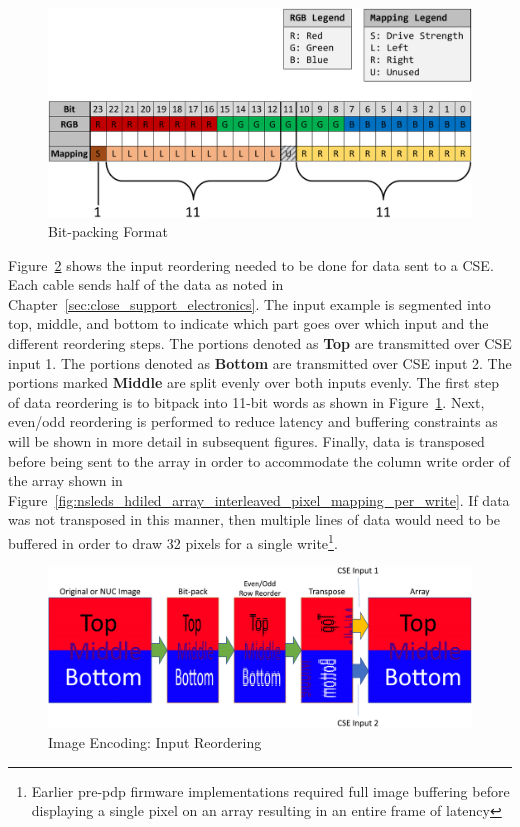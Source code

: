     \begin{figure}
        \centering
        \includegraphics[trim=0in 0in 0in 0in,width=1.0\textwidth]{fig/bit_packing.pdf}
        \caption{Bit-packing Format}
        \label{fig:bit_packing}
    \end{figure}

    Figure~\ref{fig:image_encoding} shows the input reordering needed to be done for data sent to a CSE. Each cable sends half of the data as noted in Chapter~\ref{sec:close_support_electronics}. The input example is segmented into top, middle, and bottom to indicate which part goes over which input and the different reordering steps. The portions denoted as \textbf{Top} are transmitted over CSE input 1. The portions denoted as \textbf{Bottom} are transmitted over CSE input 2. The portions marked \textbf{Middle} are split evenly over both inputs evenly. The first step of data reordering is to bitpack into 11-bit words as shown in Figure~\ref{fig:bit_packing}. Next, even/odd reordering is performed to reduce latency and buffering constraints as will be shown in more detail in subsequent figures. Finally, data is transposed before being sent to the array in order to accommodate the column write order of the array shown in Figure~\ref{fig:nsleds_hdiled_array_interleaved_pixel_mapping_per_write}. If data was not transposed in this manner, then multiple lines of data would need to be buffered in order to draw 32 pixels for a single write\footnote{Earlier pre-pdp firmware implementations required full image buffering before displaying a single pixel on an array resulting in an entire frame of latency}.


    \begin{figure}
        \centering
        \includegraphics[trim=0in 0in 0in 0in,width=1.0\textwidth]{fig/image_encoding.pdf}
        \caption{Image Encoding: Input Reordering}
        \label{fig:image_encoding}
    \end{figure}

